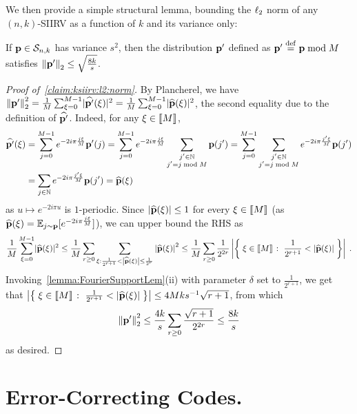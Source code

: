 We then provide a simple structural lemma, bounding the $\lp[2]$ norm of any $(n,k)$-SIIRV as a function of $k$ and its variance only:
\begin{lemma}\label{claim:ksiirv:l2:norm}
  If $\p \in \mathcal{S}_{n, k}$ has variance $s^2$, then the distribution $\p'$ defined as $\p' \eqdef \p \bmod M$ satisfies 
  $
      \normtwo{\p'} \leq \sqrt{\frac{8k}{s}}
  $.
\end{lemma}
\begin{proof}[Proof of~\cref{claim:ksiirv:l2:norm}]
By Plancherel, we have
$
  \normtwo{\p'}^2 = \frac{1}{M} \sum_{\xi=0}^{M-1} \dabs{\fourier{\p'}(\xi)}^2 = \frac{1}{M} \sum_{\xi=0}^{M-1} \dabs{\fourier{\p}(\xi)}^2
$, 
the second equality due to the definition of $\fourier{\p'}$. Indeed, for any $\xi\in\modulo{M}$, 
\begin{align*}
    \fourier{\p'}(\xi) &= \sum_{j=0}^{M-1} e^{-2i\pi \frac{j\xi}{M}} \p'(j) = \sum_{j=0}^{M-1} e^{-2i\pi \frac{j\xi}{M}} \sum_{\substack{j'\in\mathbb{N}\\j' = j \bmod M}} \p(j')
    = \sum_{j=0}^{M-1} \sum_{\substack{j'\in\mathbb{N}\\j' = j \bmod M}} e^{-2i\pi \frac{j'\xi}{M}} \p(j')
    \\
    &= \sum_{j\in\mathbb{N}} e^{-2i\pi \frac{j'\xi}{M}} \p(j')
    = \fourier{\p}(\xi)
\end{align*}
as $u\mapsto e^{-2i\pi u}$ is $1$-periodic. Since $\abs{\fourier{\p}(\xi)}\leq 1$ for every $\xi\in\modulo{M}$ (as $\fourier{\p}(\xi) = \shortexpect_{j\sim \p}[e^{-2i\pi \frac{j\xi}{M}}]$), we can upper bound the RHS as
\[
    \frac{1}{M} \sum_{\xi=0}^{M-1} \dabs{\fourier{\p}(\xi)}^2 \leq \frac{1}{M} \sum_{r\geq 0} \sum_{\xi : \frac{1}{2^{r+1}} < \abs{\fourier{\p}(\xi)} \leq \frac{1}{2^{r}}} \abs{\fourier{\p}(\xi)}^2
    \leq \frac{1}{M} \sum_{r\geq 0} \frac{1}{2^{2r}} \abs{\setOfSuchThat{ \xi\in\modulo{M} }{ \frac{1}{2^{r+1}} < \abs{\fourier{\p}(\xi)} }}\;.
\]
Invoking~\cref{lemma:FourierSupportLem}(ii) with parameter $\delta$ set to $\frac{1}{2^{r+1}}$, we get that $\abs{\setOfSuchThat{ \xi\in\modulo{M} }{ \frac{1}{2^{r+1}} < \abs{\fourier{\p}(\xi)} }} \leq 4Mk s^{-1} \sqrt{r+1}$, from which \[
    \normtwo{\p'}^2 \leq \frac{4k}{s} \sum_{r\geq 0} \frac{\sqrt{r+1}}{2^{2r}} \leq \frac{8k}{s}
\]
as desired.
\end{proof}


\section{Error-Correcting Codes.} 

